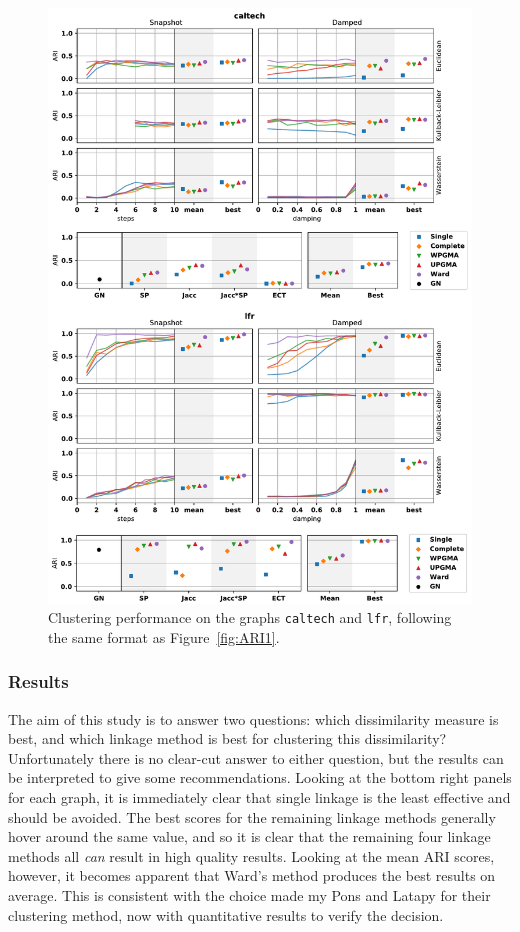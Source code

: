 \begin{figure}
  \centering
  \includegraphics[height=.95\textheight]{power/ARI2.pdf}
  \caption[Experimental clustering results for \texttt{caltech} and \texttt{lfr}]{Clustering performance on the graphs \texttt{caltech} and \texttt{lfr}, following the same format as Figure~\ref{fig:ARI1}.}
  \label{fig:ARI2}
\end{figure}

\subsubsection{Results}
The aim of this study is to answer two questions: which dissimilarity measure is best, and which linkage method is best for clustering this dissimilarity?
Unfortunately there is no clear-cut answer to either question, but the results can be interpreted to give some recommendations. Looking at the bottom right panels for each graph, it is immediately clear that single linkage is the least effective and should be avoided. The best scores for the remaining linkage methods generally hover around the same value, and so it is clear that the remaining four linkage methods all \emph{can} result in high quality results. Looking at the mean ARI scores, however, it becomes apparent that Ward's method produces the best results on average. This is consistent with the choice made my Pons and Latapy \cite{Pons2006} for their clustering method, now with quantitative results to verify the decision.

